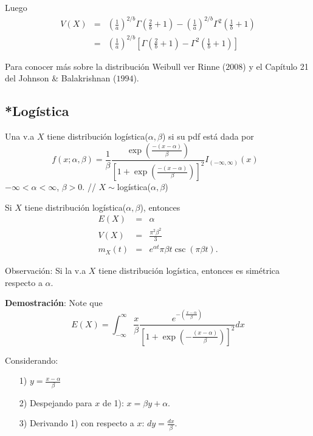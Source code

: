 \begin{i}
Luego 
\begin{eqnarray*}
V(X) &=&\left( \frac{1}{a}\right) ^{2/b}\Gamma \left( \frac{2}{b}+1\right)
-\left( \frac{1}{a}\right) ^{2/b}\Gamma ^{2}\left( \frac{1}{b}+1\right) \\
&=&\left( \frac{1}{a}\right) ^{2/b}\left[ \Gamma \left( \frac{2}{b}+1\right)
-\Gamma ^{2}\left( \frac{1}{b}+1\right) \right]
\end{eqnarray*}

Para conocer más sobre la distribución Weibull ver Rinne ($2008$) y el Capítulo 21 del Johnson \& Balakrishnan ($1994$).


\subsection{*Logística}


\begin{definition}
 Una v.a $X$ tiene distribución logística($\alpha ,\beta $) si su pdf está dada por 
\begin{equation*}
f(x;\alpha ,\beta )=\frac{1}{\beta }\frac{\exp \left( \frac{-(x-\alpha )}{
\beta }\right) }{\left[ 1+\exp \left( \frac{-(x-\alpha )}{\beta }\right) 
\right] ^{2}}I_{(-\infty ,\infty )}(x)\text{ }
\end{equation*}%
$-\infty <\alpha <\infty $, $\beta >0$. // $X\sim $logística($\alpha
,\beta $)
\end{definition}


\begin{theorem}
Si $X$ tiene distribución logística($\alpha,\beta $), entonces
\begin{eqnarray*}
E(X) &=&\alpha \\
V(X) &=&\frac{\pi ^{2}\beta ^{2}}{3} \\
m_{X}(t) &=&e^{\alpha t}\pi \beta t\csc \left( \pi \beta t\right) .
\end{eqnarray*}    
\end{theorem}


Observación: Si la v.a $X$ tiene distribución logística,
entonces es simétrica respecto a $\alpha $.

\textbf{Demostración}:
Note que 
\begin{equation*}
E(X)=\int_{-\infty }^{\infty }\frac{x}{\beta }\frac{e^{-\left( \frac{
x-\alpha }{\beta }\right) }}{\left[ 1+\exp \left( -\frac{(x-\alpha )}{\beta }
\right) \right] ^{2}}dx
\end{equation*}

Considerando:
\begin{enumerate}
\item[1)] $y=\frac{x-\alpha }{\beta }$
\item[2)] Despejando para $x$ de 1): $x=\beta y+\alpha .$
\item[3)] Derivando 1) con respecto a $x$: $dy=\frac{dx}{\beta }$.
\end{enumerate}


\end{i}
